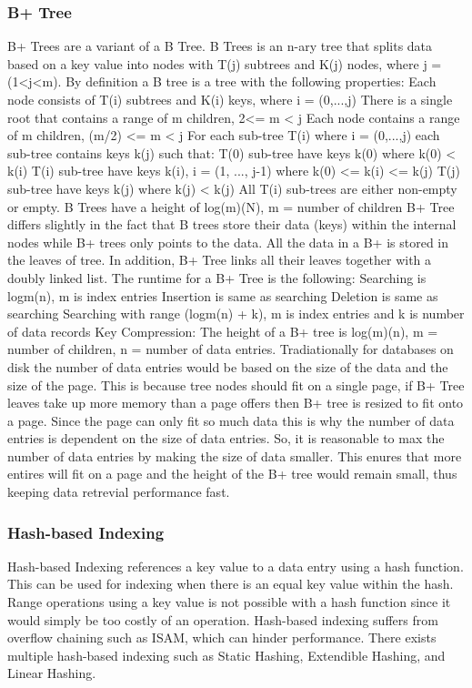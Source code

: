 \documentclass[letterpaper, 12pt]{article}
\renewcommand{\includegraphics}[2][]{\fbox{}}
\begin{document}
\subsubsection{B+ Tree}
B+ Trees are a variant of a B Tree. B Trees is an n-ary tree that splits data
	based on a key value into nodes with T(j) subtrees and K(j) nodes, where j = (1<j<m).
	By definition a B tree is a tree with the following properties:
	Each node consists of T(i) subtrees and K(i) keys, where i = (0,...,j)
	There is a single root that contains a range of m children, 2<= m < j
	Each node contains a range of m children, (m/2) <= m < j
	For each sub-tree T(i) where i = (0,...,j) each sub-tree contains keys k(j) such that:
		T(0) sub-tree have keys k(0) where k(0) < k(i)
		T(i) sub-tree have keys k(i), i = (1, ..., j-1) where k(0) <= k(i) <= k(j)
		T(j) sub-tree have keys k(j) where k(j) < k(j)
	All T(i) sub-trees are either non-empty or empty.
	B Trees have a height of log(m)(N), m = number of children
B+ Tree differs slightly in the fact that B trees store their data (keys) within the internal nodes while B+ trees only points to the data. All the data in a B+ is stored in the leaves of tree. In addition, B+ Tree links all their leaves together with a doubly linked list.
The runtime for a B+ Tree is the following:
Searching is logm(n), m is index entries
Insertion is same as searching
Deletion is same as searching
Searching with range (logm(n) + k), m is index entries and k is number of data records
Key Compression:
The height of a B+ tree is log(m)(n), m = number of children, n = number of data entries.
Tradiationally for databases on disk the number of data entries would be based on the size of the data and
the size of the page. This is because tree nodes should fit on a single page, if B+ Tree leaves take up more memory than a page offers then B+ tree is resized to fit onto a page. Since the page can only fit so much data this is why the number of data entries is dependent on the size of data entries. So, it is reasonable to max the number of data entries by making the size of data smaller. This enures that more entires will fit on a page and the height of the B+ tree would remain small, thus keeping data retrevial performance fast.
\subsubsection{Hash-based Indexing}
	Hash-based Indexing references a key value to a data entry using a hash function. This can be used for indexing when there is an equal key value within the hash. Range operations using a key value is not possible with a hash function since it would simply be too costly of an operation. Hash-based indexing suffers from overflow chaining such as ISAM, which can hinder performance. There exists multiple hash-based indexing such as Static Hashing, Extendible Hashing, and Linear Hashing. 
\end{document}
